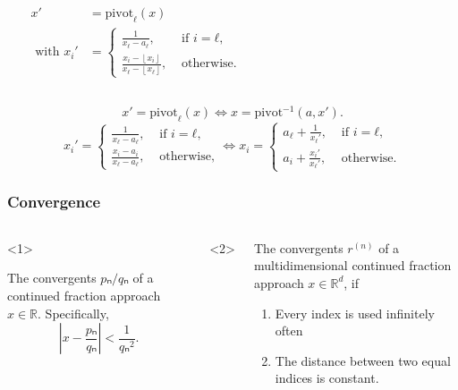 \documentclass[aspectratio=169]{beamer}
\newcommand\floor[1]{\left\lfloor#1\right\rfloor}
\begin{document}
\begin{frame}[fragile]
\begin{columns}
\begin{center}
    \end{center}
    \begin{align*}
      x' & = \mathrm{pivot}_ℓ(x) \\
      \text{ with } x_i' & =
      \begin{cases}
        \frac{1}{x_ℓ - a_ℓ}, & \text{ if } i = ℓ, \\
        \frac{x_i - \floor{x_i}}{x_ℓ - \floor{x_ℓ}}, & \text{ otherwise}.
      \end{cases}
    \end{align*}
  \end{columns}
\end{frame}

\begin{frame}
  \[
    x' = \mathrm{pivot}_ℓ(x)
    \iff
    x = \mathrm{pivot}^{-1}(a, x').
  \]
  \[
    x_i' =
    \begin{cases}
      \frac{1}{x_ℓ - a_ℓ}, & \text{ if } i = ℓ, \\
      \frac{x_i - a_i}{x_ℓ - a_ℓ}, & \text{ otherwise},
    \end{cases}
    \iff
    x_i =
    \begin{cases}
      a_ℓ + \frac{1}{x_ℓ'}, & \text{ if } i = ℓ, \\
      a_i + \frac{x_i'}{x_ℓ'}, & \text{ otherwise}.
    \end{cases}
  \]
\end{frame}


\begin{frame}
  \frametitle{Convergence}
  \small
  \begin{columns}
    \begin{onlyenv}<1>
      \begin{theorem}
        The convergents $pₙ/qₙ$ of a continued fraction approach $x ∈ ℝ$.
        Specifically,
        \[
          \left|x - \frac{pₙ}{qₙ}\right| < \frac{1}{qₙ^2}.
        \]
      \end{theorem}
    \end{onlyenv}
    \begin{onlyenv}<2>
    \end{onlyenv}

    \begin{theorem}
      The convergents $r^{(n)}$ of a multidimensional continued fraction approach $x ∈ ℝ^d$, if
      \begin{enumerate}
        \item Every index is used infinitely often
        \item The distance between two equal indices is constant.
      \end{enumerate}
    \end{theorem}
  \end{columns}
\end{frame}
\end{document}
